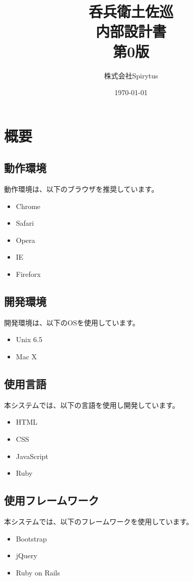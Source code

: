 \documentclass[a4j,titlepage]{jarticle}
\title{呑兵衛土佐巡\\
内部設計書\\
第0版}
\author{株式会社Spirytus}
\date{\today}
\begin{document}
\maketitle
\tableofcontents

\clearpage

\section{概要}
\subsection{動作環境}
動作環境は、以下のブラウザを推奨しています。
\begin{itemize}
\item Chrome
\item Safari
\item Opera
\item IE
\item Fireforx
\end{itemize}

\subsection{開発環境}
開発環境は、以下のOSを使用しています。
\begin{itemize}
\item Unix 6.5
\item Mac X
\end{itemize}

\subsection{使用言語}
本システムでは、以下の言語を使用し開発しています。
\begin{itemize}
\item HTML
\item CSS
\item JavaScript
\item Ruby
\end{itemize}

\subsection{使用フレームワーク}
本システムでは、以下のフレームワークを使用しています。
\begin{itemize}
\item Bootstrap
\item jQuery
\item Ruby on Rails
\end{itemize}
\end{document}
